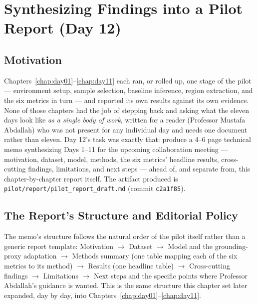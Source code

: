 \chapter{Synthesizing Findings into a Pilot Report (Day 12)}
\label{chap:day12}

\section{Motivation}

Chapters~\ref{chap:day01}--\ref{chap:day11} each ran, or rolled up, one stage of the pilot ---
environment setup, sample selection, baseline inference, region extraction, and the six metrics
in turn --- and reported its own results against its own evidence. None of those chapters had
the job of stepping back and asking what the eleven days look like \emph{as a single body of
work}, written for a reader (Professor Mustafa Abdallah) who was not present for any individual
day and needs one document rather than eleven. Day 12's task was exactly that: produce a
4--6 page technical memo synthesizing Days 1--11 for the upcoming collaboration meeting ---
motivation, dataset, model, methods, the six metrics' headline results, cross-cutting findings,
limitations, and next steps --- ahead of, and separate from, this chapter-by-chapter report
itself. The artifact produced is \texttt{pilot/report/pilot\_report\_draft.md} (commit
\texttt{c2a1f85}).

\section{The Report's Structure and Editorial Policy}

The memo's structure follows the natural order of the pilot itself rather than a generic report
template: Motivation $\rightarrow$ Dataset $\rightarrow$ Model and the grounding-proxy adaptation
$\rightarrow$ Methods summary (one table mapping each of the six metrics to its method)
$\rightarrow$ Results (one headline table) $\rightarrow$ Cross-cutting findings $\rightarrow$
Limitations $\rightarrow$ Next steps and the specific points where Professor Abdallah's guidance
is wanted. This is the same structure this chapter set later expanded, day by day, into
Chapters~\ref{chap:day01}--\ref{chap:day11}.


